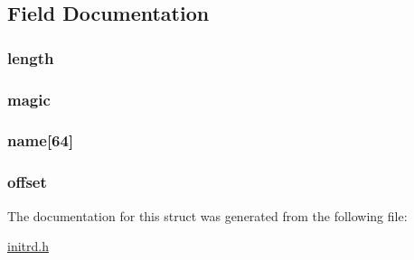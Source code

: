 \subsection{Field Documentation}
\hypertarget{structinitrd__file__header_aeec37a8314ab06b3088adcc9ae433fa4}{
\subsubsection[{length}]{ {\bf length}}}
\label{structinitrd__file__header_aeec37a8314ab06b3088adcc9ae433fa4}
\hypertarget{structinitrd__file__header_a04da1f4036c5c1453e6f6b9c8656ae1c}{
\subsubsection[{magic}]{ {\bf magic}}}
\label{structinitrd__file__header_a04da1f4036c5c1453e6f6b9c8656ae1c}
\hypertarget{structinitrd__file__header_a9ae4535aa9418230183438e85d054c9b}{
\subsubsection[{name}]{ {\bf name}\mbox{[}64\mbox{]}}}
\label{structinitrd__file__header_a9ae4535aa9418230183438e85d054c9b}
\hypertarget{structinitrd__file__header_aa1d165d830b3ec7f9523dcb357883cb9}{
\subsubsection[{offset}]{ {\bf offset}}}
\label{structinitrd__file__header_aa1d165d830b3ec7f9523dcb357883cb9}


The documentation for this struct was generated from the following file:\begin{DoxyCompactItemize}
\item 
\hyperlink{initrd_8h}{initrd.h}\end{DoxyCompactItemize}
